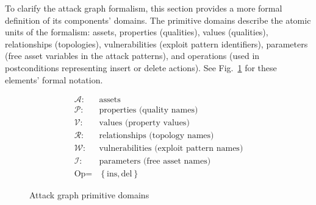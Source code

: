 \label{sec:domains}
To clarify the attack graph formalism,
this section provides a more formal definition of its components' domains.
The primitive domains describe the atomic units of
the formalism: assets, properties (qualities), values (qualities), relationships (topologies),
vulnerabilities (exploit pattern identifiers), parameters (free asset variables in the attack
patterns), and operations (used in postconditions representing insert or delete actions).
See Fig.~\ref{fig:primitivedomains} for these elements' formal notation.

\begin{figure}
\begin{align*}
    \mathcal{A} :& \text{assets} \\
    \mathcal{P} :& \text{properties (quality names)} \\
    \mathcal{V} :& \text{values (property values)} \\
    \mathcal{R} :& \text{relationships (topology names)} \\
    \mathcal{W} :& \text{vulnerabilities (exploit pattern names)} \\
    \mathcal{I} :& \text{parameters (free asset names)} \\
    \text{Op} =& \left\{\text{ins}, \text{del} \right\}
\end{align*}
\caption{Attack graph primitive domains}
\label{fig:primitivedomains}
\end{figure}

